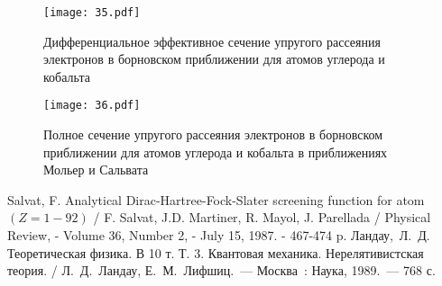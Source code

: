 \documentclass[a4paper,14pt]{extarticle} %
\begin{document}
	\begin{figure}[h!]
		\centering
		\caption{Дифференциальное эффективное сечение упругого рассеяния электронов в борновском приближении для атомов углерода и кобальта}
		\label{ris: 3.5}
		\texttt{[image: 35.pdf]}
	\end{figure}
	
	\begin{figure}[h!]
		\centering
		\caption{Полное сечение упругого рассеяния электронов в борновском приближении для атомов углерода и кобальта в приближениях Мольер и Сальвата}
		\label{ris: 3.6}
		\texttt{[image: 36.pdf]}
	\end{figure}
	\clearpage

\begin{thebibliography}{10}
 Salvat, F. Analytical Dirac-Hartree-Fock-Slater screening 
function for atom $(Z=1-92)$ / F. Salvat, J.D. Martiner, R. Mayol, J. 
Parellada / Physical Review, - Volume 36, Number 2, - July 15, 1987. - 
467-474 p.
 Ландау,~Л.~Д. Теоретическая физика. В 10 т. Т. 3. Квантовая механика. Нерелятивистская теория. / Л.~Д.~Ландау, Е.~М.~Лифшиц.~--- Москва~: Наука, 1989.~--- 768 с.
\end{thebibliography}
\newpage 
\appendix
\end{document}
